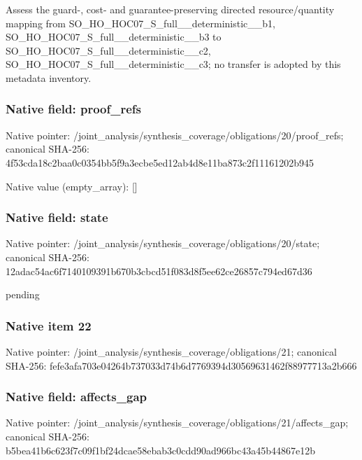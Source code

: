 \documentclass[10pt,a4paper]{article}
\begin{document}
\begingroup\raggedright\sloppy Assess the guard-,\allowbreak{} cost- and guarantee-preserving directed resource/\allowbreak{}quantity mapping from SO\_\allowbreak{}HO\_\allowbreak{}HOC07\_\allowbreak{}S\_\allowbreak{}full\_\allowbreak{}\_\allowbreak{}deterministic\_\allowbreak{}\_\allowbreak{}b1,\allowbreak{} SO\_\allowbreak{}HO\_\allowbreak{}HOC07\_\allowbreak{}S\_\allowbreak{}full\_\allowbreak{}\_\allowbreak{}deterministic\_\allowbreak{}\_\allowbreak{}b3 to SO\_\allowbreak{}HO\_\allowbreak{}HOC07\_\allowbreak{}S\_\allowbreak{}full\_\allowbreak{}\_\allowbreak{}deterministic\_\allowbreak{}\_\allowbreak{}c2,\allowbreak{} SO\_\allowbreak{}HO\_\allowbreak{}HOC07\_\allowbreak{}S\_\allowbreak{}full\_\allowbreak{}\_\allowbreak{}deterministic\_\allowbreak{}\_\allowbreak{}c3;\allowbreak{} no transfer is adopted by this metadata inventory.\par\endgroup

\subsubsection{Native field: proof\_\allowbreak{}refs}
Native pointer: /joint\_\allowbreak{}analysis/synthesis\_\allowbreak{}coverage/obligations/20/proof\_\allowbreak{}refs; canonical SHA-256: 4f53cda18c2baa0c0354bb5f9a3ecbe5ed12ab4d8e11ba873c2f11161202b945

Native value (empty\_\allowbreak{}array): []

\subsubsection{Native field: state}
Native pointer: /joint\_\allowbreak{}analysis/synthesis\_\allowbreak{}coverage/obligations/20/state; canonical SHA-256: 12adac54ac6f7140109391b670b3cbcd51f083d8f5ee62ce26857c794ed67d36

\begingroup\raggedright\sloppy pending\par\endgroup

\subsubsection{Native item 22}
Native pointer: /joint\_\allowbreak{}analysis/synthesis\_\allowbreak{}coverage/obligations/21; canonical SHA-256: fefe3afa703e04264b737033d74b6d7769394d30569631462f88977713a2b666

\subsubsection{Native field: affects\_\allowbreak{}gap}
Native pointer: /joint\_\allowbreak{}analysis/synthesis\_\allowbreak{}coverage/obligations/21/affects\_\allowbreak{}gap; canonical SHA-256: b5bea41b6c623f7c09f1bf24dcae58ebab3c0cdd90ad966bc43a45b44867e12b
\end{document}
